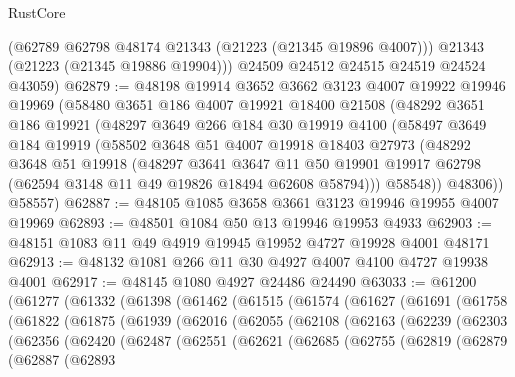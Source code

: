 \begin{lexlean}{RustCore}
\begin{coremodule}
        (@62789 @62798 @48174 @21343 (@21223 (@21345 @19896 @4007)))
        @21343
        (@21223 (@21345 @19886 @19904)))
      @24509
      @24512
      @24515
      @24519
      @24524
      @43059)
@62879 := @48198
    @19914
    @3652
    @3662
    @3123
    @4007
    @19922
    @19946
    @19969
    (@58480
      @3651
      @186
      @4007
      @19921
      @18400
      @21508
      (@48292
        @3651
        @186
        @19921
        (@48297
          @3649
          @266
          @184
          @30
          @19919
          @4100
          (@58497
            @3649
            @184
            @19919
            (@58502
              @3648
              @51
              @4007
              @19918
              @18403
              @27973
              (@48292
                @3648
                @51
                @19918
                (@48297
                  @3641
                  @3647
                  @11
                  @50
                  @19901
                  @19917
                  @62798
                  (@62594 @3148 @11 @49 @19826 @18494 @62608 @58794)))
              @58548))
          @48306))
      @58557)
@62887 := @48105 @1085 @3658 @3661 @3123 @19946 @19955 @4007 @19969
@62893 := @48501 @1084 @50 @13 @19946 @19953 @4933
@62903 := @48151 @1083 @11 @49 @4919 @19945 @19952 @4727 @19928 @4001 @48171
@62913 := @48132 @1081 @266 @11 @30 @4927 @4007 @4100 @4727 @19938 @4001
@62917 := @48145 @1080 @4927 @24486 @24490
@63033 := @61200
    (@61277
      (@61332
        (@61398
          (@61462
            (@61515
              (@61574
                (@61627
                  (@61691
                    (@61758
                      (@61822
                        (@61875
                          (@61939
                            (@62016
                              (@62055
                                (@62108
                                  (@62163
                                    (@62239
                                      (@62303
                                        (@62356
                                          (@62420
                                            (@62487
                                              (@62551
                                                (@62621
                                                  (@62685
                                                    (@62755
                                                      (@62819
                                                        (@62879
                                                          (@62887
                                                            (@62893

\end{coremodule}
\end{lexlean}
